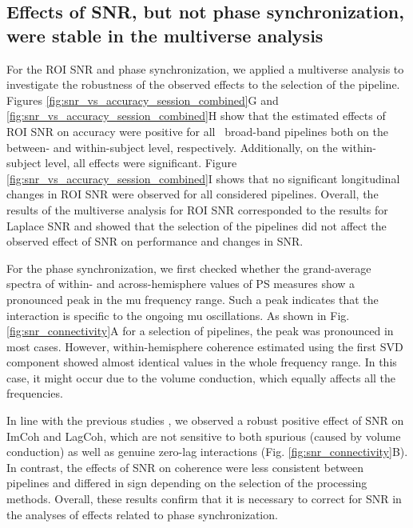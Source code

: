 \subsection{Effects of SNR, but not phase synchronization, were stable in the multiverse analysis}

For the ROI SNR and phase synchronization, we applied a multiverse analysis to investigate the robustness of the observed effects to the selection of the pipeline. Figures \ref{fig:snr_vs_accuracy_session_combined}G and \ref{fig:snr_vs_accuracy_session_combined}H show that the estimated effects of ROI SNR on accuracy were positive for all \numBBPipelines~broad-band pipelines both on the between- and within-subject level, respectively. Additionally, on the within-subject level, all effects were significant. Figure \ref{fig:snr_vs_accuracy_session_combined}I shows that no significant longitudinal changes in ROI SNR were observed for all considered pipelines. Overall, the results of the multiverse analysis for ROI SNR corresponded to the results for Laplace SNR and showed that the selection of the pipelines did not affect the observed effect of SNR on performance and changes in SNR.

\medskip

For the phase synchronization, we first checked whether the grand-average spectra of within- and across-hemisphere values of PS measures show a pronounced peak in the mu frequency range. Such a peak indicates that the interaction is specific to the ongoing mu oscillations. As shown in Fig. \ref{fig:snr_connectivity}A for a selection of pipelines, the peak was pronounced in most cases. However, within-hemisphere coherence estimated using the first SVD component showed almost identical values in the whole frequency range. In this case, it might occur due to the volume conduction, which equally affects all the frequencies.

\medskip

In line with the previous studies \citep{Bayraktaroglu2013, Vidaurre2020}, we observed a robust positive effect of SNR on ImCoh and LagCoh, which are not sensitive to both spurious (caused by volume conduction) as well as genuine zero-lag interactions (Fig. \ref{fig:snr_connectivity}B). In contrast, the effects of SNR on coherence were less consistent between pipelines and differed in sign depending on the selection of the processing methods. Overall, these results confirm that it is necessary to correct for SNR in the analyses of effects related to phase synchronization.

